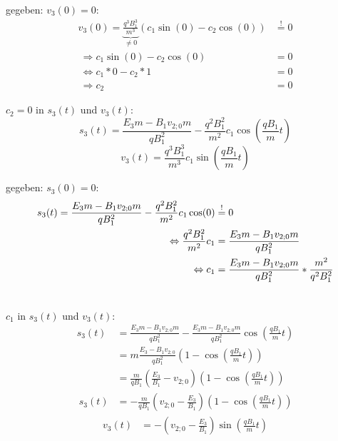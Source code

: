 \documentclass[german, a4paper, 10pt]{article}
\begin{document}
gegeben: $v_3(0) = 0$:
\begin{equation}
\begin{split}
v_3(0) = \underbrace{\frac{q^3 B_1^3}{m^3}}_{\neq 0} (c_1 \sin(0) - c_2 \cos(0)) &\overset{\text{!}}{=} 0  \\\
\Rightarrow c_1 \sin(0) - c_2 \cos(0) &= 0 \\\
\Leftrightarrow c_1 * 0 - c_2 * 1 &= 0 \\\
\Rightarrow c_2 &= 0
\end{split}
\end{equation}

$c_2=0$ in $s_3(t)$ und $v_3(t)$:
\begin{equation}
s_3(t) = \frac{E_3 m - B_1 v_{2;0} m}{q B_1^2} - \frac{q^2 B_1^2}{m^2} c_1 \cos\left(\frac{q B_1}{m} t\right)
\end{equation}
%
\begin{equation}
v_3(t) = \frac{q^3 B_1^3}{m^3} c_1 \sin\left(\frac{q B_1}{m} t\right)
\end{equation}

gegeben: $s_3(0) = 0$:
\begin{equation}
\begin{split}
s_3(t) = \frac{E_3 m - B_1 v_{2;0} m}{q B_1^2} - \frac{q^2 B_1^2}{m^2} c_1 \cos(0) &\overset{\text{!}}{=} 0 \\\
\Leftrightarrow \hfill \frac{q^2 B_1^2}{m^2} c_1 &= \frac{E_3 m - B_1 v_{2;0} m}{q B_1^2} \\\
\Leftrightarrow \hfill c_1 &= \frac{E_3 m - B_1 v_{2;0} m}{q B_1^2} * \frac{m^2}{q^2 B_1^2} \\\
\end{split}
\end{equation}

$c_1$ in $s_3(t)$ und $v_3(t)$:
\begin{equation}
\begin{split}
s_3(t) 	&= \frac{E_3 m - B_1 v_{2;0} m}{q B_1^2} - \frac{E_3 m - B_1 v_{2;0} m}{q B_1^2} \cos\left(\frac{q B_1}{m} t\right)  \\\
		&= m \frac{E_3 - B_1 v_{2;0}}{q B_1^2} \left( 1 - \cos\left(\frac{q B_1}{m} t\right)\right) \\\
%
		&= 	\frac{m}{q B_1}	\left( \frac{E_3}{B_1} - v_{2;0} \right) \left( 1 - \cos\left(\frac{q B_1}{m} t\right)\right) \\\
%
s_3(t)  &= -\frac{m}{q B_1}	\left( v_{2;0} -\frac{E_3}{B_1} \right) \left( 1 - \cos\left(\frac{q B_1}{m} t\right)\right)
\end{split}
\end{equation}
%
\begin{equation}
\begin{split}
v_3(t) &= -\left(v_{2;0} - \frac{E_3}{B_1}\right) \sin\left(\frac{q B_1}{m} t\right)
\end{split}
\end{equation}
\end{document}
